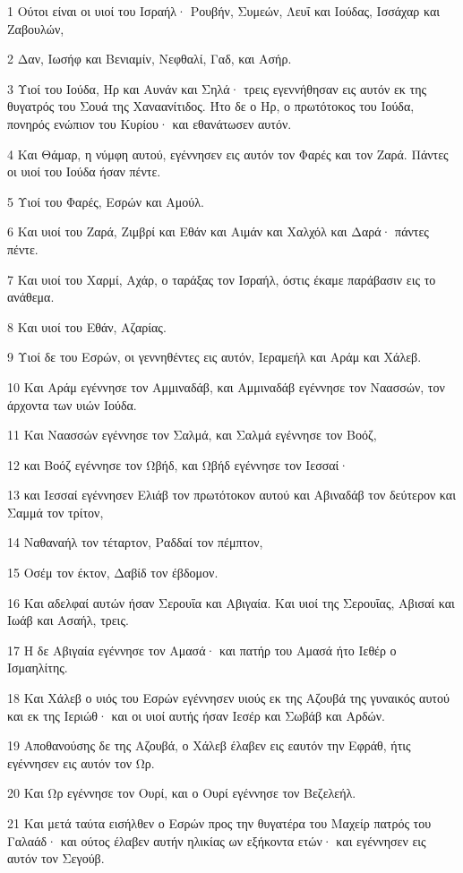 \par 1 Ούτοι είναι οι υιοί του Ισραήλ· Ρουβήν, Συμεών, Λευΐ και Ιούδας, Ισσάχαρ και Ζαβουλών,
\par 2 Δαν, Ιωσήφ και Βενιαμίν, Νεφθαλί, Γαδ, και Ασήρ.
\par 3 Υιοί του Ιούδα, Ηρ και Αυνάν και Σηλά· τρεις εγεννήθησαν εις αυτόν εκ της θυγατρός του Σουά της Χαναανίτιδος. Ήτο δε ο Ηρ, ο πρωτότοκος του Ιούδα, πονηρός ενώπιον του Κυρίου· και εθανάτωσεν αυτόν.
\par 4 Και Θάμαρ, η νύμφη αυτού, εγέννησεν εις αυτόν τον Φαρές και τον Ζαρά. Πάντες οι υιοί του Ιούδα ήσαν πέντε.
\par 5 Υιοί του Φαρές, Εσρών και Αμούλ.
\par 6 Και υιοί του Ζαρά, Ζιμβρί και Εθάν και Αιμάν και Χαλχόλ και Δαρά· πάντες πέντε.
\par 7 Και υιοί του Χαρμί, Αχάρ, ο ταράξας τον Ισραήλ, όστις έκαμε παράβασιν εις το ανάθεμα.
\par 8 Και υιοί του Εθάν, Αζαρίας.
\par 9 Υιοί δε του Εσρών, οι γεννηθέντες εις αυτόν, Ιεραμεήλ και Αράμ και Χάλεβ.
\par 10 Και Αράμ εγέννησε τον Αμμιναδάβ, και Αμμιναδάβ εγέννησε τον Ναασσών, τον άρχοντα των υιών Ιούδα.
\par 11 Και Ναασσών εγέννησε τον Σαλμά, και Σαλμά εγέννησε τον Βοόζ,
\par 12 και Βοόζ εγέννησε τον Ωβήδ, και Ωβήδ εγέννησε τον Ιεσσαί·
\par 13 και Ιεσσαί εγέννησεν Ελιάβ τον πρωτότοκον αυτού και Αβιναδάβ τον δεύτερον και Σαμμά τον τρίτον,
\par 14 Ναθαναήλ τον τέταρτον, Ραδδαί τον πέμπτον,
\par 15 Οσέμ τον έκτον, Δαβίδ τον έβδομον.
\par 16 Και αδελφαί αυτών ήσαν Σερουΐα και Αβιγαία. Και υιοί της Σερουΐας, Αβισαί και Ιωάβ και Ασαήλ, τρεις.
\par 17 Η δε Αβιγαία εγέννησε τον Αμασά· και πατήρ του Αμασά ήτο Ιεθέρ ο Ισμαηλίτης.
\par 18 Και Χάλεβ ο υιός του Εσρών εγέννησεν υιούς εκ της Αζουβά της γυναικός αυτού και εκ της Ιεριώθ· και οι υιοί αυτής ήσαν Ιεσέρ και Σωβάβ και Αρδών.
\par 19 Αποθανούσης δε της Αζουβά, ο Χάλεβ έλαβεν εις εαυτόν την Εφράθ, ήτις εγέννησεν εις αυτόν τον Ωρ.
\par 20 Και Ωρ εγέννησε τον Ουρί, και ο Ουρί εγέννησε τον Βεζελεήλ.
\par 21 Και μετά ταύτα εισήλθεν ο Εσρών προς την θυγατέρα του Μαχείρ πατρός του Γαλαάδ· και ούτος έλαβεν αυτήν ηλικίας ων εξήκοντα ετών· και εγέννησεν εις αυτόν τον Σεγούβ.
